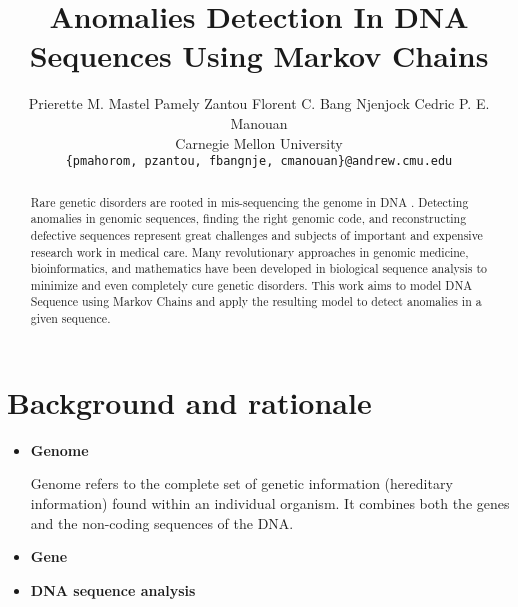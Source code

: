 \documentclass[10pt,twocolumn,letterpaper]{article}
\begin{document}
\title{Anomalies Detection In DNA Sequences Using Markov Chains}

\author{Prierette M. Mastel \quad Pamely Zantou \quad Florent C. Bang Njenjock \quad Cedric P. E. Manouan \\
Carnegie Mellon University\\
{\tt\small \{pmahorom, pzantou, fbangnje, cmanouan\}@andrew.cmu.edu}
}


\maketitle

\begin{abstract}
    Rare genetic disorders are rooted in mis-sequencing the
    genome in DNA \cite{posey}. Detecting anomalies in genomic sequences, finding the right genomic code, and reconstructing
    defective sequences represent great challenges and subjects
    of important and expensive research work in medical care.
    Many revolutionary approaches in genomic medicine, bioinformatics, and mathematics have been developed in biological
    sequence analysis to minimize and even completely cure
    genetic disorders. This work aims to model DNA Sequence
    using Markov Chains and apply the resulting model to detect anomalies in a given sequence.
\end{abstract}


\section{Background and rationale}
 {
   \begin{itemize}
      \item \textbf{Genome}
      \par Genome refers to the complete set of genetic information (hereditary information) found within an individual organism.
       \cite{krawetz2003introduction} It combines   both the genes and the non-coding sequences of the DNA.
      \item \textbf{Gene} 
      \item \textbf{DNA sequence analysis}
   \end{itemize}
 }
\end{document}
